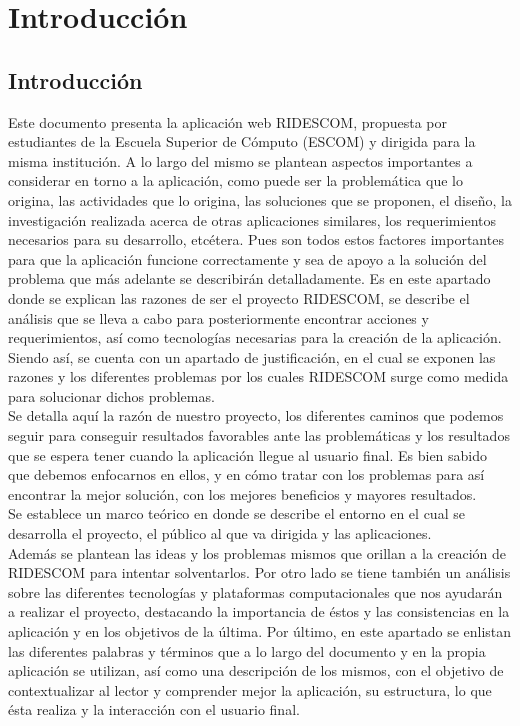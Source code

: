 \chapter{Introducción}
	\section{Introducci\'on}
	
	\noindent Este documento presenta la aplicación web RIDESCOM, propuesta por estudiantes de la Escuela Superior de Cómputo (ESCOM) y dirigida para la misma institución. A lo largo del mismo se plantean aspectos importantes a considerar en torno a la aplicación, como puede ser la problemática que lo origina, las actividades que lo origina, las soluciones que se proponen, el diseño, la investigación realizada acerca de otras aplicaciones similares, los requerimientos necesarios para su desarrollo, etcétera. Pues son todos estos factores importantes para que la aplicación funcione correctamente y sea de apoyo a la solución del problema que más adelante se describirán detalladamente. Es en este apartado donde se explican las razones de ser el proyecto RIDESCOM, se describe el análisis que se lleva a cabo para posteriormente encontrar acciones y requerimientos, así como tecnologías necesarias para la creación de la aplicación. 
	Siendo así, se cuenta con un apartado de justificación, en el cual se exponen las razones y los diferentes problemas por los cuales RIDESCOM surge como medida para solucionar dichos problemas.\\
	Se detalla aquí la razón de nuestro proyecto, los diferentes caminos que podemos seguir para conseguir resultados favorables ante las problemáticas y los resultados que se espera tener cuando la aplicación llegue al usuario final. Es bien sabido que debemos enfocarnos en ellos, y en cómo tratar con los problemas para así encontrar la mejor solución, con los mejores beneficios y mayores resultados.\\
	Se establece un marco teórico en donde se describe el entorno en el cual se desarrolla el proyecto, el público al que va dirigida y las aplicaciones.\\
	Además se plantean las ideas y los problemas mismos que orillan a la creación de RIDESCOM para intentar solventarlos. Por otro lado se tiene también un análisis sobre las diferentes tecnologías y plataformas computacionales que nos ayudarán a realizar el proyecto, destacando la importancia de éstos y las consistencias en la aplicación y en los objetivos de la última. Por último, en este apartado se enlistan las diferentes palabras y términos que a lo largo del documento y en la propia aplicación se utilizan, así como una descripción de los mismos, con el objetivo de contextualizar al lector y comprender mejor la aplicación, su estructura, lo que ésta realiza y la interacción con el usuario final.\\
